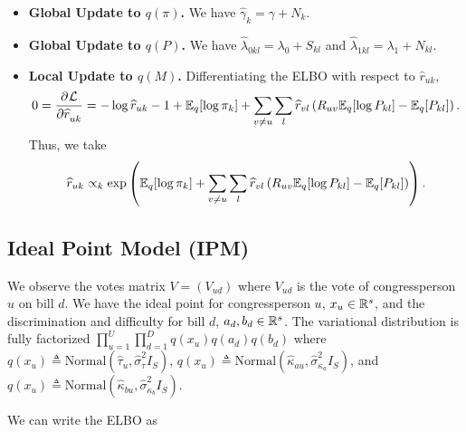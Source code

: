 \documentclass{article}
\begin{document}
\begin{itemize}
\item {\bf Global Update to $q(\pi)$.} We have $\widehat \gamma_{k} = \gamma + N_k$.
\item {\bf Global Update to $q(P)$.} We have $\widehat \lambda_{0kl} = \lambda_0 + S_{kl}$ and $\widehat \lambda_{1kl} = \lambda_1 + N_{kl}$.
\item {\bf Local Update to $q(M)$.} Differentiating the ELBO with respect to $\widehat r_{uk}$,
$$
0 = \frac{\partial^{}\mathcal{L}}{\partial \widehat r_{uk}^{}}= -\log \widehat r_{uk} -1 + \mathbb{E}_q[\log \pi_k]
+ \sum_{v\neq u} \sum_l \widehat r_{vl}\left(R_{uv}\mathbb{E}_q[\log P_{kl}] - \mathbb{E}_q[P_{kl}]\right).
$$
Thus, we take 
$$
\widehat r_{uk} \propto_k \exp\left(\mathbb{E}_q[\log \pi_k]
+ \sum_{v\neq u} \sum_l \widehat r_{vl}\left(R_{uv}\mathbb{E}_q[\log P_{kl}] - \mathbb{E}_q[P_{kl}]\right)\right).
$$
\end{itemize}


\subsection{Ideal Point Model (IPM)}
\label{ipmvi}


We observe the votes matrix $V = (V_{ud})$ where $V_{ud}$ is the vote of congressperson $u$ on bill $d$. We have the ideal point for congressperson $u$, $x_u \in \mathbb{R}^s$, and the discrimination and difficulty for bill $d$, $a_d,b_d \in \mathbb{R}^s$. The variational distribution is fully factorized $\prod_{u=1}^U \prod_{d=1}^D q(x_u)q(a_d)q(b_d)$ where $q(x_u) \triangleq \text{Normal}(\hat{\tau}_u, \hat{\sigma}^2_\tau I_S)$, $q(x_u) \triangleq \text{Normal}(\hat{\kappa}_{au}, \hat{\sigma}^2_{\kappa_a} I_S)$, and $q(x_u) \triangleq \text{Normal}(\hat{\kappa}_{bu}, \hat{\sigma}^2_{\kappa_b} I_S)$. \vspace{.5em}

We can write the ELBO as \vspace{-1em}
\end{document}
